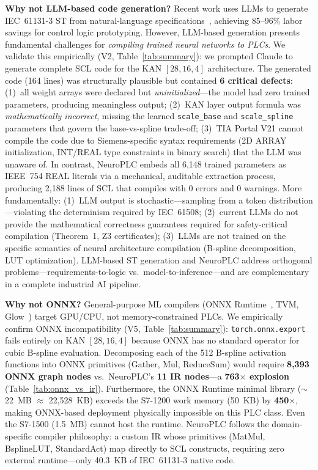 \documentclass[journal,onecolumn]{IEEEtran}
\newcommand{\neuroplc}{NeuroPLC\xspace}
\begin{document}
\vspace{4pt}
\noindent\textbf{Why not LLM-based code generation?}
Recent work uses LLMs to generate IEC~61131-3 ST from natural-language
specifications~\cite{haag2025llm4iec,stark2026,spec2control2025}, achieving
85--96\% labor savings for control logic prototyping. However, LLM-based
generation presents fundamental challenges for \textit{compiling trained neural
networks to PLCs}. We validate this empirically (V2, Table~\ref{tab:summary}): we prompted
Claude to generate complete SCL code for the KAN $[28,16,4]$ architecture.
The generated code (164 lines) was structurally plausible but contained
\textbf{6 critical defects}: (1)~all weight arrays were declared but
\textit{uninitialized}---the model had zero trained parameters, producing
meaningless output; (2)~KAN layer output formula was \textit{mathematically
incorrect}, missing the learned \texttt{scale\_base} and \texttt{scale\_spline}
parameters that govern the base-vs-spline trade-off; (3)~TIA Portal V21
cannot compile the code due to Siemens-specific syntax requirements (2D
ARRAY initialization, INT/REAL type constraints in binary search) that
the LLM was unaware of. In contrast, NeuroPLC embeds all 6,148 trained
parameters as IEEE~754 REAL literals via a mechanical, auditable extraction
process, producing 2,188 lines of SCL that compiles with 0 errors and 0
warnings. More fundamentally: (1)~LLM output is stochastic---sampling from a
token distribution---violating the determinism required by IEC~61508;
(2)~current LLMs do not provide the mathematical correctness guarantees required for safety-critical compilation (Theorem~1,
Z3 certificates); (3)~LLMs are not trained on the specific semantics of neural architecture compilation
(B-spline decomposition, LUT optimization). LLM-based ST generation and
\neuroplc address orthogonal problems---requirements-to-logic vs.\
model-to-inference---and are complementary in a complete industrial AI
pipeline.

\vspace{4pt}
\noindent\textbf{Why not ONNX?}
General-purpose ML compilers (ONNX Runtime~\cite{onnxruntime}, TVM,
Glow~\cite{roth2018glow}) target GPU/CPU, not memory-constrained PLCs.
We empirically confirm ONNX incompatibility (V5, Table~\ref{tab:summary}): \texttt{torch.onnx.export}
fails entirely on KAN $[28,16,4]$ because ONNX has no standard operator for
cubic B-spline evaluation. Decomposing each of the 512 B-spline activation
functions into ONNX primitives (Gather, Mul, ReduceSum) would require
\textbf{8,393 ONNX graph nodes} vs.\ NeuroPLC's \textbf{11 IR nodes}---a
\textbf{763$\times$ explosion} (Table~\ref{tab:onnx_vs_ir}). Furthermore,
the ONNX Runtime minimal library ($\sim$22~MB $\approx$ 22{,}528~KB) exceeds
the S7-1200 work memory (50~KB) by \textbf{450$\times$}, making ONNX-based
deployment physically impossible on this PLC class. Even the S7-1500
(1.5~MB) cannot host the runtime. \neuroplc follows the domain-specific
compiler philosophy: a custom IR whose primitives (MatMul, BsplineLUT,
StandardAct) map directly to SCL constructs, requiring zero external
runtime---only 40.3~KB of IEC~61131-3 native code.
\end{document}
